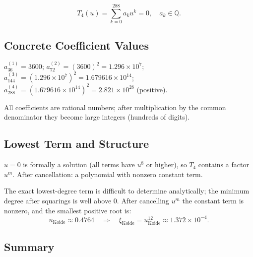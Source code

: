 \[
  T_4(u)=\sum_{k=0}^{288}a_ku^k=0, \quad a_k\in\mathbb{Q}.
\]

\begin{center}
\renewcommand{\arraystretch}{1.4}
\end{center}

\subsection{Concrete Coefficient Values}

$a_{36}^{(1)}=3600$;
$a_{72}^{(2)}=(3600)^2=1.296\times10^7$;
$a_{144}^{(3)}=(1.296\times10^7)^2=1.679616\times10^{14}$;
$a_{288}^{(4)}=(1.679616\times10^{14})^2=2.821\times10^{28}$ (positive).

All coefficients are rational numbers; after multiplication by the common denominator
they become large integers (hundreds of digits).

\subsection{Lowest Term and Structure}

$u=0$ is formally a solution (all terms have $u^8$ or higher), so $T_4$ contains
a factor $u^m$. After cancellation: a polynomial with nonzero constant term.

The exact lowest-degree term is difficult to determine analytically; the minimum
degree after squarings is well above 0. After cancelling $u^m$ the constant term
is nonzero, and the smallest positive root is:
\[
  u_{\text{Koide}}\approx0.4764
  \quad\Rightarrow\quad
  \xi_{\text{Koide}}=u_{\text{Koide}}^{12}\approx1.372\times10^{-4}.
\]

\subsection{Summary}

